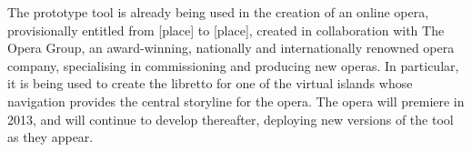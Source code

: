 \begin{draft}
  The prototype tool is already being used in the creation of an online opera, provisionally entitled from [place] to [place], created in collaboration with The Opera Group, an award-winning, nationally and internationally renowned opera company, specialising in commissioning and producing new operas. In particular, it is being used to create the libretto for one of the virtual islands whose navigation provides the central storyline for the opera. The opera will premiere in 2013, and will continue to develop thereafter, deploying new versions of the tool as they appear.
\end{draft}






\stopcontents[chapters]
